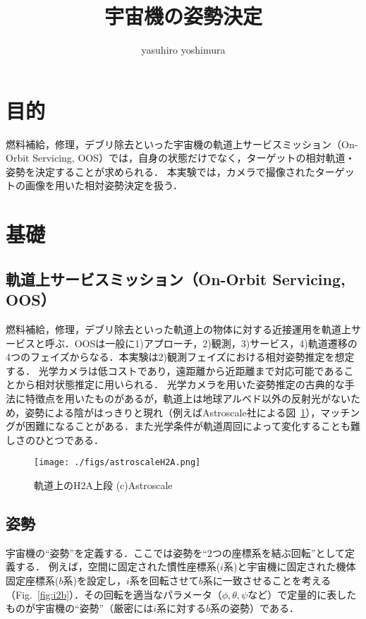 \documentclass{article}
\begin{document}
\title{宇宙機の姿勢決定}

\author[1]{yasuhiro yoshimura}

\maketitle


\section{目的}
燃料補給，修理，デブリ除去といった宇宙機の軌道上サービスミッション（On-Orbit Servicing, OOS）では，自身の状態だけでなく，ターゲットの相対軌道・姿勢を決定することが求められる．
本実験では，カメラで撮像されたターゲットの画像を用いた相対姿勢決定を扱う．

\section{基礎}
\subsection{軌道上サービスミッション（On-Orbit Servicing, OOS）}
燃料補給，修理，デブリ除去といった軌道上の物体に対する近接運用を軌道上サービスと呼ぶ．OOSは一般に1)アプローチ，2)観測，3)サービス，4)軌道遷移の4つのフェイズからなる．本実験は2)観測フェイズにおける相対姿勢推定を想定する．
光学カメラは低コストであり，遠距離から近距離まで対応可能であることから相対状態推定に用いられる．
光学カメラを用いた姿勢推定の古典的な手法に特徴点を用いたものがあるが，軌道上は地球アルベド以外の反射光がないため，姿勢による陰がはっきりと現れ（例えばAstroscale社による図~\ref{fig:h2a}），マッチングが困難になることがある．また光学条件が軌道周回によって変化することも難しさのひとつである．
\begin{figure}[tb]
\centering
\texttt{[image: ./figs/astroscaleH2A.png]}
\caption{軌道上のH2A上段 (c)Astroscale}
\label{fig:h2a}
\end{figure}

\subsection{姿勢}\label{sec:attitude}
宇宙機の``姿勢''を定義する．ここでは姿勢を``2つの座標系を結ぶ回転''として定義する．
例えば，空間に固定された慣性座標系($i$系)と宇宙機に固定された機体固定座標系($b$系)を設定し，$i$系を回転させて$b$系に一致させることを考える（Fig.~\ref{fig:i2b}）．その回転を適当なパラメータ（$\phi,\theta,\psi$など）で定量的に表したものが宇宙機の``姿勢''（厳密には$i$系に対する$b$系の姿勢）である．
\end{document}
